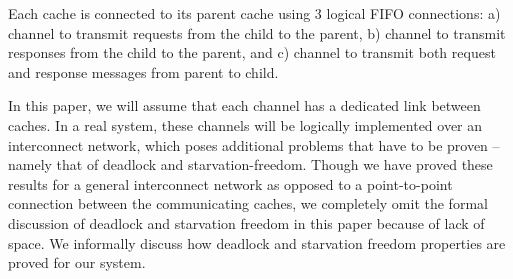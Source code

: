 Each cache is connected to its parent cache using 3 logical FIFO connections: a)
\cpReq{} channel to transmit requests from the child to the parent, b) \cpResp{}
channel to transmit responses from the child to the parent, and c) \pc{}
channel to transmit both request and response messages from
parent to child.


In this paper, we will assume that each channel has a dedicated link between
caches. In a real system, these channels will be logically implemented over an
interconnect network, which poses additional problems that have to be proven --
namely that of deadlock and starvation-freedom. Though we have proved these
results for a general interconnect network as opposed to a point-to-point
connection between the communicating caches, we completely omit the formal
discussion of deadlock and starvation freedom in this paper because of lack of
space. We  informally discuss how deadlock and starvation
freedom properties are proved for our system.

